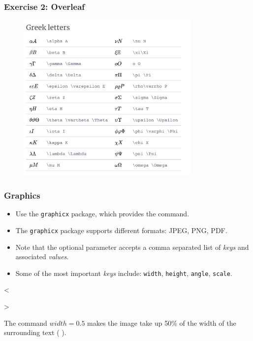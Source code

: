 \documentclass{beamer}
\def\openesc{\color{blue}}
\def\closeesc{\color{black}}
\def\vbdelim{\catcode`<=\active\catcode`>=\active%
\def<{\openesc}
\def>{\closeesc}}
\begin{document}
\begin{frame}[fragile]
\frametitle{Exercise 2: Overleaf}
\begin{figure}
\includegraphics[width=90mm]{figures/Greek.png}
\end{figure}
\end{frame}
\begin{frame}[fragile]
\frametitle{Graphics}
\begin{itemize}
\item Use the  \verb|graphicx| package, which provides the  \color{black} command. \\
\item The \verb|graphicx| package supports different formats: JPEG, PNG, PDF. \\
\item Note that the optional parameter accepts a comma separated list of \textit{keys} and associated \textit{values}.\\
\item Some of the most important \textit{keys} include: \verb|width|, \verb|height|, \verb|angle|, \verb|scale|. \\
\end{itemize}
\begin{framed}
\begin{verbnobox}[\vbdelim]
<>
\end{verbnobox}
\end{framed}
The command $width=0.5$ makes the image take up 50\% of the width of the surrounding text ( \color{blue}{\verb|\textwidth|}\color{black}).
\end{frame}
\end{document}
